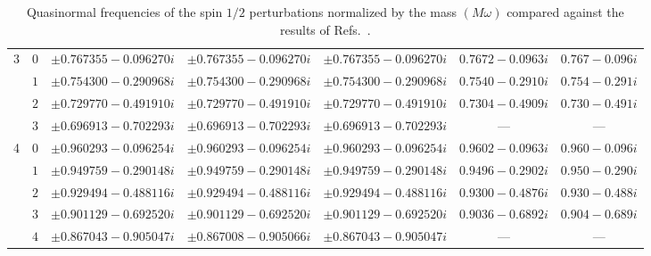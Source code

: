 \begin{table}[ht]
{\begin{tabular}{l |c|c|c|c|c|c}
      3   & $0$ & $\pm 0.767355 -0.096270 i$                & $\pm 0.767355 -0.096270 i$                 & $\pm 0.767355 -0.096270 i$     & $0.7672-0.0963 i$      & $0.767 -0.096i$        \\
          & $1$ & $\pm 0.754300 -0.290968 i$                & $\pm 0.754300 -0.290968 i$                 & $\pm 0.754300 -0.290968 i$     & $0.7540-0.2910 i$      & $0.754 -0.291i$        \\
          & $2$ & $\pm 0.729770 -0.491910 i$                & $\pm 0.729770 -0.491910 i$                 & $\pm 0.729770 -0.491910 i$     & $0.7304-0.4909 i$      & $0.730 -0.491i$        \\
          & $3$ & $\pm 0.696913 -0.702293 i$                & $\pm 0.696913 -0.702293 i$                 & $\pm 0.696913 -0.702293 i$     & ---                    & ---                    \\ \hline
      4   & $0$ & $\pm 0.960293 -0.096254 i$                & $\pm 0.960293 -0.096254 i$                 & $\pm 0.960293 -0.096254 i$     & $0.9602-0.0963 i$      & $0.960 -0.096i$        \\
          & $1$ & $\pm 0.949759 -0.290148 i$                & $\pm 0.949759 -0.290148 i$                 & $\pm 0.949759 -0.290148 i$     & $0.9496-0.2902 i$      & $0.950 -0.290i$        \\
          & $2$ & $\pm 0.929494 -0.488116 i$                & $\pm 0.929494 -0.488116 i$                 & $\pm 0.929494 -0.488116 i$     & $0.9300-0.4876 i$      & $0.930 -0.488i$        \\
          & $3$ & $\pm 0.901129 -0.692520 i$                & $\pm 0.901129 -0.692520 i$                 & $\pm 0.901129 -0.692520 i$     & $0.9036-0.6892 i$      & $0.904 -0.689i$        \\
          & $4$ & $\pm 0.867043 -0.905047 i$                & $\pm 0.867008 -0.905066 i$                 & $\pm 0.867043 -0.905047 i$     & ---                    & ---                    \\
      \hline\hline
    \end{tabular}%
  }
  \caption{
    Quasinormal frequencies of the spin $1/2$ perturbations normalized by the mass $(M\omega)$ compared against the results of Refs.~\cite{Cho:2003qe, Shu:2005fw}.
  }
  \label{Tab:Spin1/2}
\end{table}

